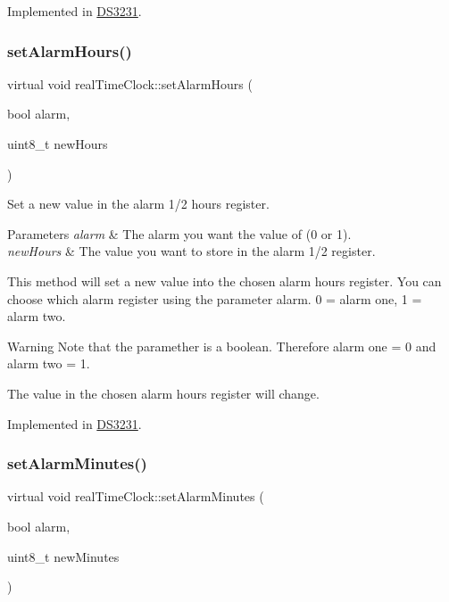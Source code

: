 Implemented in \mbox{\hyperlink{class_d_s3231_aa2048cc766ca58f707e84cbc564c1276}{D\+S3231}}.

\mbox{\label{classreal_time_clock_a9f0cd64ce9a783f149fcbb9f7eb36524}} 
\subsubsection{\texorpdfstring{set\+Alarm\+Hours()}{setAlarmHours()}}
{\footnotesize\ttfamily virtual void real\+Time\+Clock\+::set\+Alarm\+Hours (\begin{DoxyParamCaption}\item[{bool}]{alarm,  }\item[{uint8\+\_\+t}]{new\+Hours }\end{DoxyParamCaption})\hspace{0.3cm}{\ttfamily [pure virtual]}}



Set a new value in the alarm 1/2 hours register. 


\begin{DoxyParams}{Parameters}
{\em alarm} & The alarm you want the value of (0 or 1). \\
\hline
{\em new\+Hours} & The value you want to store in the alarm 1/2 register.\\
\hline
\end{DoxyParams}
This method will set a new value into the chosen alarm hours register. You can choose which alarm register using the parameter alarm. 0 = alarm one, 1 = alarm two. \begin{DoxyWarning}{Warning}
Note that the paramether is a boolean. Therefore alarm one = 0 and alarm two = 1. 

The value in the chosen alarm hours register will change. 
\end{DoxyWarning}


Implemented in \mbox{\hyperlink{class_d_s3231_a0bcc7e2285869ffbe29d19c593f5a447}{D\+S3231}}.

\mbox{\label{classreal_time_clock_a53ffba88cd87d05af58288fb4fc589b5}} 
\subsubsection{\texorpdfstring{set\+Alarm\+Minutes()}{setAlarmMinutes()}}
{\footnotesize\ttfamily virtual void real\+Time\+Clock\+::set\+Alarm\+Minutes (\begin{DoxyParamCaption}\item[{bool}]{alarm,  }\item[{uint8\+\_\+t}]{new\+Minutes }\end{DoxyParamCaption})\hspace{0.3cm}{\ttfamily [pure virtual]}}



